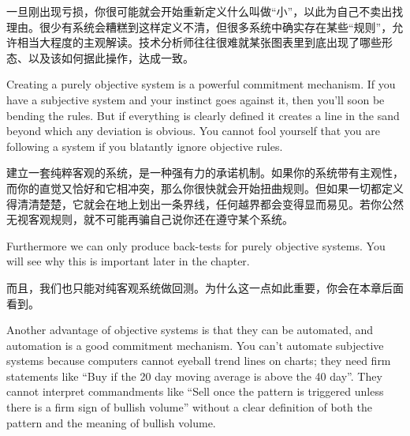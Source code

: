 \begin{chineseblock}一旦刚出现亏损，你很可能就会开始重新定义什么叫做“小”，以此为自己不卖出找理由。很少有系统会糟糕到这样定义不清，但很多系统中确实存在某些“规则”，允许相当大程度的主观解读。技术分析师往往很难就某张图表里到底出现了哪些形态、以及该如何据此操作，达成一致。\end{chineseblock}

\bipairgap

\begin{englishblock} Creating a purely objective system is a powerful commitment mechanism. If you have a subjective system and your instinct goes against it, then you'll soon be bending the rules. But if everything is clearly defined it creates a line in the sand beyond which any deviation is obvious. You cannot fool yourself that you are following a system if you blatantly ignore objective rules. \end{englishblock}

\begin{chineseblock}建立一套纯粹客观的系统，是一种强有力的承诺机制。如果你的系统带有主观性，而你的直觉又恰好和它相冲突，那么你很快就会开始扭曲规则。但如果一切都定义得清清楚楚，它就会在地上划出一条界线，任何越界都会变得显而易见。若你公然无视客观规则，就不可能再骗自己说你还在遵守某个系统。\end{chineseblock}

\bipairgap

\begin{englishblock} Furthermore we can only produce back-tests for purely objective systems. You will see why this is important later in the chapter. \end{englishblock}

\begin{chineseblock}而且，我们也只能对纯客观系统做回测。为什么这一点如此重要，你会在本章后面看到。\end{chineseblock}


\begin{englishblock} Another advantage of objective systems is that they can be automated, and automation is a good commitment mechanism. You can't automate subjective systems because computers cannot eyeball trend lines on charts; they need firm statements like ``Buy if the 20 day moving average is above the 40 day''. They cannot interpret commandments like ``Sell once the pattern is triggered unless there is a firm sign of bullish volume'' without a clear definition of both the pattern and the meaning of bullish volume. \end{englishblock}


